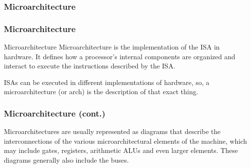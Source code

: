 \documentclass[aspectratio=169]{beamer}
\begin{document}
\subsubsection{Microarchitecture}
\begin{frame}
  \frametitle{Microarchitecture}
  \begin{block}{Microarchitecture}
    Microarchitecture is the implementation of the ISA in hardware. It defines how a processor's internal components are organized and interact to execute the instructions described by the ISA.   
  \end{block}
  ISAs can be executed in different implementations of hardware, so, a microarchitecture (or \textmu arch) is the description of that exact thing. 
\end{frame}


\begin{frame}
  \frametitle{Microarchitecture (cont.)}
  Microarchitectures are usually represented as diagrams that describe the interconnections of the various microarchitectural elements of the machine, which may include gates, registers, arithmetic ALUs and even larger elements. These diagrams generally also include the buses. 
\end{frame}
\end{document}
